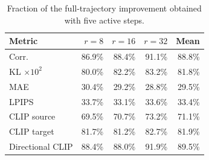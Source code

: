 \documentclass{article} %
\begin{document}
\begin{table}[h]
    \centering
    \small
    \caption{Fraction of the full-trajectory improvement obtained with five active steps.}
    \label{tab:first-steps-share}
    \begin{tabular}{lrrrr}
        \toprule
        Metric & $r=8$ & $r=16$ & $r=32$ & Mean \\
        \midrule
        Corr. & 86.9\% & 88.4\% & 91.1\% & 88.8\% \\
        KL $\times10^2$ & 80.0\% & 82.2\% & 83.2\% & 81.8\% \\
        MAE & 30.4\% & 29.2\% & 28.8\% & 29.5\% \\
        LPIPS & 33.7\% & 33.1\% & 33.6\% & 33.4\% \\
        CLIP source & 69.5\% & 70.7\% & 73.2\% & 71.1\% \\
        CLIP target & 81.7\% & 81.2\% & 82.7\% & 81.9\% \\
        Directional CLIP & 88.4\% & 88.0\% & 91.9\% & 89.5\% \\
        \bottomrule
    \end{tabular}
\end{table}
\end{document}
